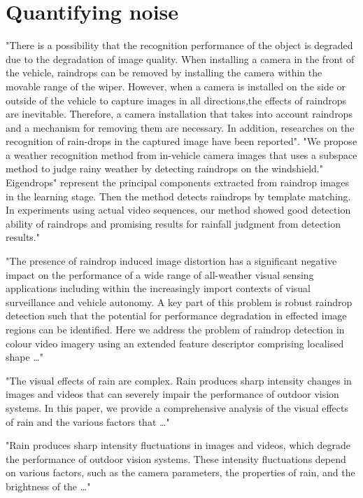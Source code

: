\section{Quantifying noise}
\cite{yoneda2019automated} "There is a possibility that the recognition performance of the object is degraded due to the degradation of image quality. When installing a camera in the front of the vehicle, raindrops can be removed by installing the camera within the movable range of the wiper. However, when a camera is installed on the side or outside of the vehicle to capture images in all directions,the effects of raindrops are inevitable. Therefore, a camera installation that takes into account raindrops and a mechanism for removing them are necessary. In addition, researches on the recognition of rain-drops in the captured image have been reported".  
\cite{kurihata2005rainy} "We propose a weather recognition method from in-vehicle camera images that uses a
subspace method to judge rainy weather by detecting raindrops on the windshield."
Eigendrops" represent the principal components extracted from raindrop images in the
learning stage. Then the method detects raindrops by template matching. In experiments
using actual video sequences, our method showed good detection ability of raindrops and
promising results for rainfall judgment from detection results."  
  
 \cite{webster2015improved} "The presence of raindrop induced image distortion has a significant negative impact on the
performance of a wide range of all-weather visual sensing applications including within the
increasingly import contexts of visual surveillance and vehicle autonomy. A key part of this
problem is robust raindrop detection such that the potential for performance degradation in
effected image regions can be identified. Here we address the problem of raindrop detection
in colour video imagery using an extended feature descriptor comprising localised shape …"  
  
\cite{garg2007vision} "The visual effects of rain are complex. Rain produces sharp intensity changes in images and
videos that can severely impair the performance of outdoor vision systems. In this paper, we
provide a comprehensive analysis of the visual effects of rain and the various factors that …"  
  
\cite{garg2005does}

"Rain produces sharp intensity fluctuations in images and videos, which degrade the
performance of outdoor vision systems. These intensity fluctuations depend on various
factors, such as the camera parameters, the properties of rain, and the brightness of the …"

